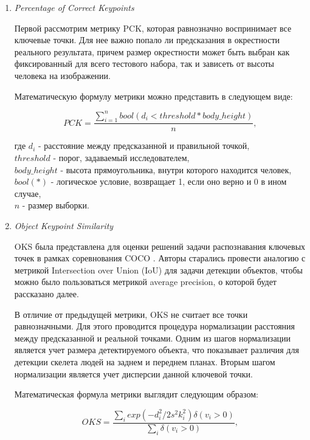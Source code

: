 \begin{enumerate}
\item \textit{Percentage of Correct Keypoints}

Первой рассмотрим метрику PCK, которая равнозначно воспринимает все ключевые точки. Для нее важно попало ли предсказания в окрестности реального результата, причем размер окрестности может быть выбран как фиксированный для всего тестового набора, так и зависеть от высоты человека на изображении. 

Математическую формулу метрики можно представить в следующем виде:

\begin{equation}
	PCK = \frac{\sum_{i=1}^{n} bool(d_i < threshold * body\_height)}{n},
\end{equation}
	
где $d_i$ - расстояние между предсказанной и правильной точкой,\\
$threshold$ - порог, задаваемый исследователем,\\
$body\_height$ - высота прямоугольника, внутри которого находится человек,\\
$bool(*)$ - логическое условие, возвращает 1, если оно верно и 0 в ином случае,\\
$n$ - размер выборки.

\item \textit{Object Keypoint Similarity}

OKS была представлена для оценки решений задачи распознавания ключевых точек в рамках соревнования COCO \cite{COCO_topology}. Авторы старались провести аналогию с метрикой Intersection over Union (IoU) для задачи детекции объектов, чтобы можно было пользоваться метрикой average precision, о которой будет рассказано далее.

В отличие от предыдущей метрики, OKS не считает все точки равнозначными. Для этого проводится процедура нормализации расстояния между предсказанной и реальной точками. Одним из шагов нормализации является учет размера детектируемого объекта, что показывает различия для детекции скелета людей на заднем и переднем планах. Вторым шагом нормализации является учет дисперсии данной ключевой точки.

Математическая формула метрики выглядит следующим образом:

\begin{equation}
	OKS = \frac{\sum_{i} exp\left( - d_i^2 / 2s^2k_i^2\right)\delta\left(v_i > 0\right)}{\sum_{i} \delta\left(v_i > 0\right)},
\end{equation}


\end{enumerate}
